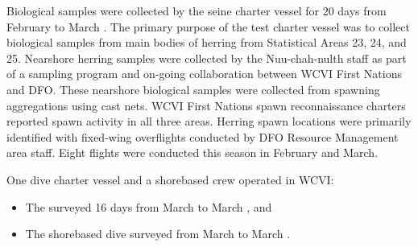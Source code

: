 Biological samples were collected by the seine charter vessel
 for 20 days from February  to March .
The primary purpose of the test charter vessel was to
collect biological samples from main bodies of herring
from Statistical Areas 23, 24, and 25.
Nearshore herring samples were collected by the Nuu-chah-nulth staff
as part of a sampling program and on-going collaboration
between WCVI First Nations and DFO.
These nearshore biological samples were collected from
spawning aggregations using cast nets.
WCVI First Nations spawn reconnaissance charters reported
spawn activity in all three areas.
Herring spawn locations were primarily identified with
fixed-wing overflights conducted by DFO Resource Management area staff.
Eight flights were conducted this season in February and March.

One dive charter vessel and a shorebased crew operated in WCVI:

\begin{itemize}

\item The  surveyed 16 days from
March  to March , and

\item The shorebased dive surveyed from March  to March .

\end{itemize}